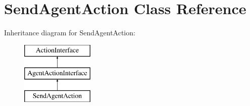 \hypertarget{class_send_agent_action}{\section{Send\-Agent\-Action Class Reference}
\label{class_send_agent_action}
}
Inheritance diagram for Send\-Agent\-Action\-:\begin{figure}[H]
\begin{center}
\leavevmode
\includegraphics[height=3.000000cm]{class_send_agent_action}
\end{center}
\end{figure}
